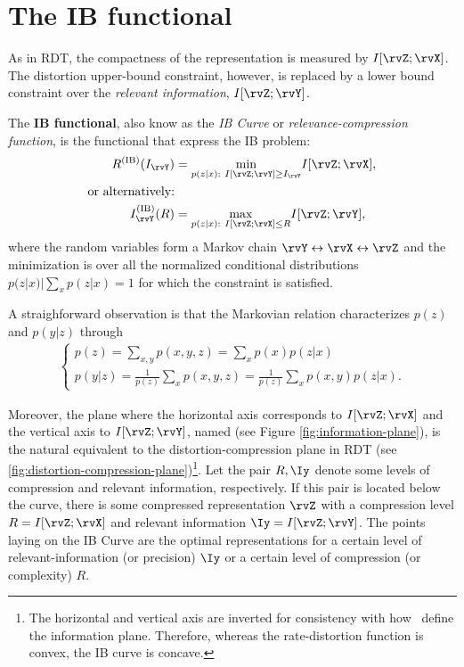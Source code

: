 \section{The IB functional}\label{sec:ib_functional}
As in {RDT}, the compactness of the representation is measured by $I[\rvZ;\rvX]$.  The distortion upper-bound constraint, however, is replaced by a lower bound constraint over the \emph{relevant information}, $I[\rvZ;\rvY]$\cite{slonim:2002}.

\begin{definition} The \textbf{IB functional}, also know as the \emph{IB Curve} or \emph{relevance-compression function}, is the functional that express the IB problem\cite{bachrach:2003}:
\begin{align}
	R^{(\text{IB})}(I_{\rvY}) &= \underset{p(z|x):~ I[\rvZ;\rvY]\geq I_{\rvY}}{\min} I[\rvZ;\rvX],\\
	\text{or alternatively:} \nonumber                                              \\
	I_{\rvY}^{(\text{IB})}(R)&= \underset{p(z|x):~ I[\rvZ;\rvX]\leq R}{\max} I[\rvZ;\rvY],
\end{align}
where the random variables form a Markov chain $\rvY \leftrightarrow  \rvX \leftrightarrow  \rvZ$ and the minimization is over all the normalized conditional distributions $p(z|x)|\sum_x p(z|x)=1$ for which the constraint is satisfied.
\end{definition}
A straighforward observation is that the Markovian relation characterizes $p(z)$ and $p(y|z)$ through\cite{slonim:2002}
\begin{align}
	\begin{cases}
		p(z) = \sum_{x,y} p(x,y,z) = \sum_x p(x)p(z|x)  \\
		p(y|z) = \frac{1}{p(z)}\sum_x p(x,y,z) = \frac{1}{p(z)}\sum_x p(x,y) p(z|x).\label{observation}
	\end{cases}
\end{align}

Moreover, the plane where the horizontal axis corresponds to $I[\rvZ;\rvX]$ and the vertical axis to $I[\rvZ;\rvY]$, named  (see Figure \cref{fig:information-plane}), is the natural equivalent to the distortion-compression plane in \acl{RDT} (see \cref{fig:distortion-compression-plane})\footnote{The horizontal and vertical axis are inverted for consistency with how~\cite{tishby:2015} define the information plane. Therefore, whereas the rate-distortion function is convex, the IB curve is concave.}. Let the pair ${R, \Iy}$ denote some levels of compression and relevant information, respectively. If this pair is located below the curve, there is some compressed representation $\rvZ$ with a compression level $R=I[\rvZ;\rvX]$ and relevant information $\Iy=I[\rvZ;\rvY]$. The points laying on the IB Curve are the optimal representations for a certain level of relevant-information (or precision) $\Iy$ or a certain level of compression (or complexity) $R$.


